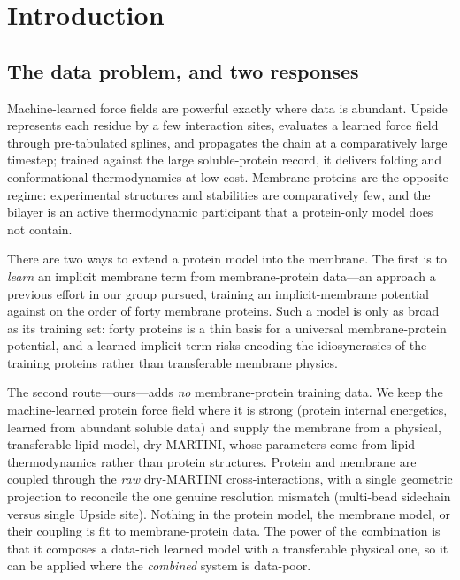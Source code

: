 \documentclass[journal=jctcce,manuscript=article,layout=twocolumn]{achemso}
\begin{document}
\section{Introduction}

\subsection{The data problem, and two responses}

Machine-learned force fields are powerful exactly where data is abundant. Upside
represents each residue by a few interaction sites, evaluates a learned force field
through pre-tabulated splines, and propagates the chain at a comparatively large
timestep;\cite{Jumper2018a,Jumper2018b} trained against the large soluble-protein
record, it delivers folding and conformational thermodynamics at low cost. Membrane
proteins are the opposite regime: experimental structures and stabilities are
comparatively few, and the bilayer is an active thermodynamic participant that a
protein-only model does not contain.

There are two ways to extend a protein model into the membrane. The first is to
\emph{learn} an implicit membrane term from membrane-protein data---an approach a
previous effort in our group pursued, training an implicit-membrane potential
against on the order of forty membrane proteins. Such a model is only as broad as
its training set: forty proteins is a thin basis for a universal membrane-protein
potential, and a learned implicit term risks encoding the idiosyncrasies of the
training proteins rather than transferable membrane physics.

The second route---ours---adds \emph{no} membrane-protein training data. We keep the
machine-learned protein force field where it is strong (protein internal energetics,
learned from abundant soluble data) and supply the membrane from a physical,
transferable lipid model, dry-MARTINI,\cite{Arnarez2015} whose parameters come from
lipid thermodynamics rather than protein structures. Protein and membrane are
coupled through the \emph{raw} dry-MARTINI cross-interactions, with a single
geometric projection to reconcile the one genuine resolution mismatch (multi-bead
sidechain versus single Upside site). Nothing in the protein model, the membrane
model, or their coupling is fit to membrane-protein data. The power of the
combination is that it composes a data-rich learned model with a transferable
physical one, so it can be applied where the \emph{combined} system is data-poor.
\end{document}
